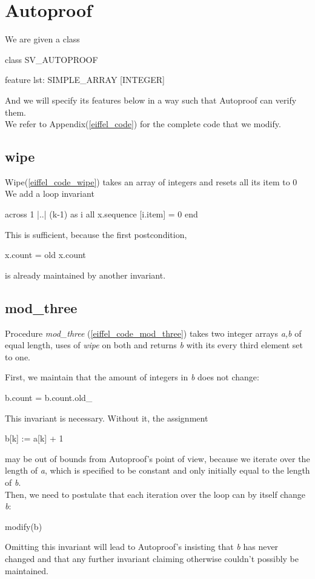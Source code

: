 \section{Autoproof}\label{eiffel_discussion}
We are given a class
\begin{eBox}
class
	SV_AUTOPROOF

feature 
	lst: SIMPLE_ARRAY [INTEGER]
\end{eBox}

And we will specify its features below in a way such that Autoproof can verify them.\\
We refer to Appendix(\ref{eiffel_code}) for the complete code that we modify.

\subsection{wipe}
Wipe(\ref{eiffel_code_wipe}) takes an array of integers and resets all its item to 0 
We add a loop invariant
\begin{eSimple}
across 1 |..| (k-1) as i all
	x.sequence [i.item] = 0 end
\end{eSimple}

This is sufficient, because the first postcondition,
\begin{eSimple}
x.count = old x.count
\end{eSimple}
is already maintained by another invariant.   

\subsection{mod\_three}
Procedure \emph{mod\_three} (\ref{eiffel_code_mod_three}) takes two integer arrays \emph{a,b} of equal length, uses of \emph{wipe} on both and returns \emph{b} with its every third element set to one.

First, we maintain that the amount of integers in \emph{b} does not change:
\begin{eSimple}
b.count = b.count.old_
\end{eSimple}
This invariant is necessary. Without it, the assignment
\begin{eSimple}
b[k] := a[k] + 1
\end{eSimple}
may be out of bounds from Autoproof's point of view, because we iterate over the length of \emph{a}, which is specified to be constant and only initially equal to the length of \emph{b}.\\

Then, we need to postulate that each iteration over the loop can by itself change \emph{b}:
\begin{eSimple}
modify(b)
\end{eSimple}
Omitting this invariant will lead to Autoproof's insisting that \emph{b} has never changed and that any further invariant claiming otherwise couldn't possibly be maintained.\\

